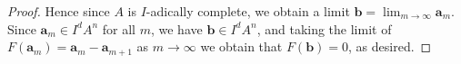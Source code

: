 \documentclass[10pt,a4paper]{amsart}
\begin{document}
\begin{proof}
		Hence since $A$ is $I$-adically complete, we obtain a limit $\mathbf{b} = \lim_{m\to \infty} \mathbf{a}_m$. Since $\mathbf{a}_m \in I^dA^n$ for all $m$, we have $\mathbf{b}\in I^dA^n$, and taking the limit of $F(\mathbf{a}_m) = \mathbf{a}_{m}-\mathbf{a}_{m+1}$ as $m\to \infty$ we obtain that $F(\mathbf{b}) = 0$, as desired.
	\end{proof}
\end{document}
